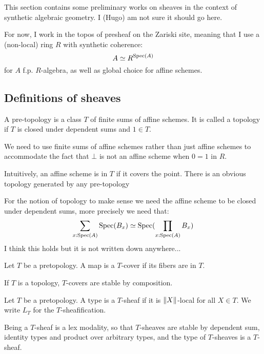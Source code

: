 This section contains some preliminary works on sheaves in the context of synthetic algebraic geometry. I (Hugo) am not sure it should go here. 

For now, I work in the topos of presheaf on the Zariski site, meaning that I use a (non-local) ring $R$ with synthetic coherence:
\[ A \simeq R^{\operatorname{Spec}(A)} \]
for $A$ f.p. $R$-algebra, as well as global choice for affine schemes.

\subsection{Definitions of sheaves}

\begin{definition}
A pre-topology is a class $T$ of finite sums of affine schemes. It is called a topology if $T$ is closed under dependent sums and $1\in T$.
\end{definition}

\begin{remark}
We need to use finite sums of affine schemes rather than just affine schemes to accommodate the fact that $\bot$ is not an affine scheme when $0=1$ in $R$.
\end{remark}

Intuitively, an affine scheme is in $T$ if it covers the point. There is an obvious topology generated by any pre-topology

\begin{remark}
For the notion of topology to make sense we need the affine scheme to be closed under dependent sums, more precisely we need that:
\[\sum_{x:\operatorname{Spec}(A)} \operatorname{Spec}(B_x) \simeq \operatorname{Spec}(\prod_{x:\operatorname{Spec}(A)} B_x)\] 
I think this holds but it is not written down anywhere...
\end{remark}

\begin{definition}
Let $T$ be a pretopology. A map is a $T$-cover if its fibers are in $T$.
\end{definition} 

If $T$ is a topology, $T$-covers are stable by composition.

\begin{definition}
Let $T$ be a pretopology. A type is a $T$-sheaf if it is $\lVert X \rVert$-local for all $X\in T$. We write $L_T$ for the $T$-sheafification.
\end{definition}

\begin{remark}
Being a $T$-sheaf is a lex modality, so that $T$-sheaves are stable by dependent sum, identity types and product over arbitrary types, and the type of $T$-sheaves is a $T$-sheaf. 
\end{remark}

